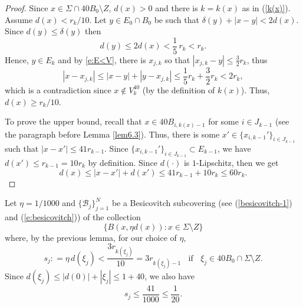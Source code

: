 \documentclass[11pt]{amsart}
\newcommand{\rf}[1]{{(\ref{#1})}}
\theoremstyle{definition}
\theoremstyle{remark}
\numberwithin{equation}{section}
\begin{document}
\begin{proof}
	Since  $x\in \Sigma\cap  40 B_{0}\setminus Z$, $d(x)>0$ and there is $k=k(x)$ as in \rf{k(x)}. Assume $d(x)<r_{k}/10$. 	
	Let $y\in E_{0}\cap B_{0}$ be such that $\delta(y)+|x-y|< 2d(x)$. Since $d(y)\leq \delta(y)$ then
	$$d(y)\leq 2d(x) <\frac15\,r_k <r_k.$$
	Hence, $y\in E_{k} $ and by \eqref{e:E<V}, there is $x_{j,k}$ so that $|x_{j,k}-y|\leq \frac{3}{2} r_{k}$, thus
	\[
	|x-x_{j,k}|\leq |x-y| + |y-x_{j,k}| \leq \frac{1}{5} r_{k}+\frac{3}{2} r_{k}<2r_{k},\]
	which is a contradiction since $x\not\in V_{k}^{40}$ (by the definition of $k(x)$). Thus, $d(x)\geq r_{k}/10$. 
	
	To prove the upper bound, recall that $x\in 40 B_{i,k(x)-1}$ for some $i\in J_{k-1}$ (see the paragraph before Lemma \ref{lem6.3}). Thus, there is some
 $x'\in \{x_{i,k-1}'\}_{i\in J_{k-1}}$ such that $|x-x'|\leq 41 r_{k-1}$.
 Since $\{x_{i,k-1}'\}_{i\in J_{k-1}}\subset E_{k-1}$, we have $d(x')\leq r_{k-1}=10r_{k}$ by definition. Since $d(\cdot)$ is $1$-Lipschitz, then we get
	\[
	d(x)\leq |x-x'|+d(x')
	\leq  41 r_{k-1}+10r_{k}\leq 60 r_k.
	\]
\end{proof}




Let $\eta=1/1000$ and $\{\mathcal B_j\}_{j=1}^N$ be a Besicovitch subcovering (see \rf{besicovitch-1} and \rf{e:besicovitch}) of the collection 
\begin{equation}\label{besic}
\{B(x, \eta d(x) ):x\in \Sigma\setminus Z\}
\end{equation}
where, by the previous lemma, for our choice of $\eta$,
\begin{equation}\label{e:s<rifxin40}
s_{j}: = \eta \,d(\xi_{j})<\frac{3r_{k(\xi_{j})}}{10}= 3r_{k(\xi_{j})-1}\;\; \mbox{ if } \;\; \xi_{j}\in 40B_{0}\cap \Sigma\setminus  Z.
\end{equation}
Since $d(\xi_j)\leq |d(0)| + |\xi_j|\leq 1 + 40$, we also have
\begin{equation}\label{e:s<rifxin40*}
s_{j}\leq \frac{41}{1000}\leq \frac1{20}.
\end{equation}
\end{document}

